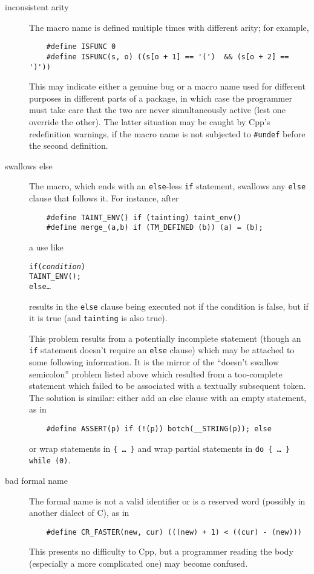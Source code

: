 \begin{description}
\item[inconsistent arity]
        The macro name is defined multiple times with different arity; for example,
\begin{verbatim}
    #define ISFUNC 0
    #define ISFUNC(s, o) ((s[o + 1] == '(')  && (s[o + 2] == ')'))
\end{verbatim}
        This may indicate either a genuine bug or a macro name used for
        different purposes in different parts of a package, in which case
        the programmer must take care that the two are never simultaneously
        active (lest one override the other).  The latter situation may be
        caught by Cpp's redefinition warnings, if the macro name is not
        subjected to {\tt \#undef} before the second definition.

\item[swallows else]
        The macro, which ends with an {\tt else}-less {\tt if} statement,
        swallows any {\tt else} clause that follows it.  For instance, after
\begin{verbatim}
    #define TAINT_ENV() if (tainting) taint_env()
    #define merge_(a,b) if (TM_DEFINED (b)) (a) = (b);
\end{verbatim}
        a use like
\begin{alltt}
    if ({\rm\em{}condition})
      TAINT_ENV();
    else \ldots
\end{alltt}
        results in the {\tt else} clause being executed not if  the
        condition is false, but if it is true (and {\tt tainting} is also
        true).
        
        This problem results from a potentially incomplete statement (though
        an {\tt if} statement doesn't require an {\tt else} clause) which
        may be attached to some following information.  It is the mirror of
        the ``doesn't swallow semicolon'' problem listed above which
        resulted from a too-complete statement which failed to be
        associated with a textually subsequent token.  The solution is
        similar: either add an else clause with an empty statement, as in
\begin{verbatim}
    #define ASSERT(p) if (!(p)) botch(__STRING(p)); else
\end{verbatim}
        or wrap statements in {\tt \verb|{| \ldots\ \verb|}|} and wrap
        partial statements in {\tt do \verb|{| {\rm \ldots}\ \verb|}| while
        (0)}.

\item[bad formal name]
        The formal name is not a valid identifier or is a reserved word
        (possibly in another dialect of C), as in
\begin{verbatim}
    #define CR_FASTER(new, cur) (((new) + 1) < ((cur) - (new)))
\end{verbatim}
        This presents no difficulty to Cpp, but a programmer reading the
        body (especially a more complicated one) may become confused.

\end{description}



